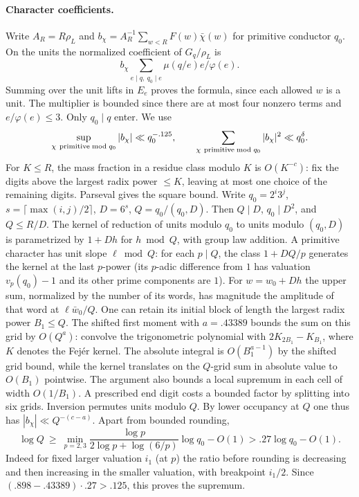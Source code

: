 \documentclass[11pt,a4paper]{article}
\theoremstyle{paperplain}
\numberwithin{equation}{section}
\begin{document}
\paragraph{Character coefficients.}
Write $A_R=R\rho_L$ and $b_\chi=A_R^{-1}\sum_{w<R}F(w)\bar\chi(w)$
for primitive conductor $q_0$. On the units the normalized
coefficient of $G_q/\rho_L$ is
\[
 b_\chi\sum_{e\mid q,\ q_0\mid e}\mu(q/e)e/\varphi(e).
\]
Summing over the unit lifts in $E_e$ proves the formula, since each
allowed $w$ is a unit. The multiplier is bounded since there are at
most four nonzero terms and $e/\varphi(e)\le3$. Only $q_0\mid q$ enter.
We use
\[
 \sup_{\chi\ {\rm primitive}\bmod q_0}|b_\chi|\ll q_0^{-.125},
 \qquad \sum_{\chi\ {\rm primitive}\bmod q_0}|b_\chi|^2\ll q_0^\delta .
\]
For $K\le R$, the mass fraction in a residue class modulo $K$ is
$O(K^{-c})$: fix the digits above the largest radix power
$\le K$, leaving at most one choice of the remaining digits.
Parseval gives the square bound. Write $q_0=2^i3^j$,
$s=\lceil\max(i,j)/2\rceil$, $D=6^s$, $Q=q_0/(q_0,D)$.
Then $Q\mid D$, $q_0\mid D^2$, and $Q\le R/D$.
The kernel of reduction of units modulo $q_0$ to units modulo
$(q_0,D)$ is parametrized by $1+Dh$ for $h\bmod Q$, with group
law addition. A primitive character has unit slope $\ell\bmod Q$:
for each $p\mid Q$, the class $1+DQ/p$ generates the kernel at the
last $p$-power (its $p$-adic difference from $1$ has valuation
$v_p(q_0)-1$ and its other prime components are $1$).
For $w=w_0+Dh$ the upper sum, normalized by the number of its words,
has magnitude the amplitude of that word at $\ell\bar w_0/Q$.
One can retain its initial block of length the largest radix power
$B_1\le Q$. The shifted first moment with $a=.43389$ bounds
the sum on this grid by $O(Q^a)$: convolve the trigonometric
polynomial with $2K_{2B_1}-K_{B_1}$, where $K$ denotes the Fej\'er
kernel. The absolute integral is $O(B_1^{a-1})$ by the shifted grid
bound, while the kernel translates on the $Q$-grid sum in absolute
value to $O(B_1)$ pointwise. The argument also bounds a local
supremum in each cell of width $O(1/B_1)$. A prescribed end
digit costs a bounded factor by splitting into six grids.
Inversion permutes units modulo $Q$. By lower occupancy at $Q$
one thus has $|b_\chi|\ll Q^{-(c-a)}$. Apart from bounded rounding,
\[
 \log Q\ \ge\ \min_{p=2,3}
 \frac{\log p}{2\log p+\log(6/p)}\log q_0-O(1)>.27\log q_0-O(1).
\]
Indeed for fixed larger valuation $i_1$ (at $p$) the ratio before
rounding is decreasing and then increasing in the smaller valuation,
with breakpoint $i_1/2$. Since $(.898-.43389)\cdot.27>.125$,
this proves the supremum.
\end{document}
